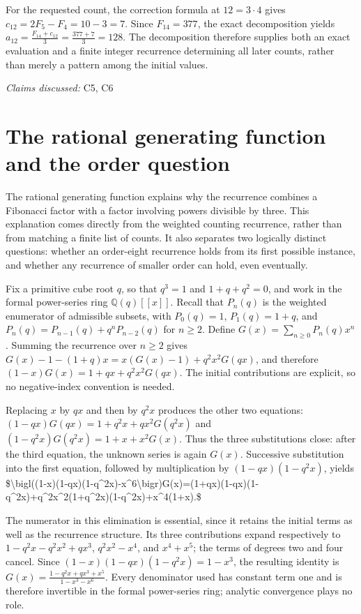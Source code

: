 \documentclass[11pt]{article}
\begin{document}
For the requested count, the correction formula at $12=3\cdot 4$ gives $c_{12}=2F_5-F_4=10-3=7$. Since $F_{14}=377$, the exact decomposition yields
$a_{12}=\frac{F_{14}+c_{12}}{3}=\frac{377+7}{3}=128.$
The decomposition therefore supplies both an exact evaluation and a finite integer recurrence determining all later counts, rather than merely a pattern among the initial values.

\textit{Claims discussed: }C5, C6
\section{The rational generating function and the order question}
The rational generating function explains why the recurrence combines a Fibonacci factor with a factor involving powers divisible by three. This explanation comes directly from the weighted counting recurrence, rather than from matching a finite list of counts. It also separates two logically distinct questions: whether an order-eight recurrence holds from its first possible instance, and whether any recurrence of smaller order can hold, even eventually.

Fix a primitive cube root $q$, so that $q^3=1$ and $1+q+q^2=0$, and work in the formal power-series ring $\mathbb{Q}(q)[[x]]$. Recall that $P_n(q)$ is the weighted enumerator of admissible subsets, with $P_0(q)=1$, $P_1(q)=1+q$, and $P_n(q)=P_{n-1}(q)+q^nP_{n-2}(q)$ for $n\geq2$. Define $G(x)=\sum_{n\geq0}P_n(q)x^n$. Summing the recurrence over $n\geq2$ gives $G(x)-1-(1+q)x=x(G(x)-1)+q^2x^2G(qx)$, and therefore
$(1-x)G(x)=1+qx+q^2x^2G(qx).$
The initial contributions are explicit, so no negative-index convention is needed.

Replacing $x$ by $qx$ and then by $q^2x$ produces the other two equations:
$(1-qx)G(qx)=1+q^2x+qx^2G(q^2x)$
and
$(1-q^2x)G(q^2x)=1+x+x^2G(x).$
Thus the three substitutions close: after the third equation, the unknown series is again $G(x)$. Successive substitution into the first equation, followed by multiplication by $(1-qx)(1-q^2x)$, yields
\$\textbackslash{}bigl((1-x)(1-qx)(1-q\textasciicircum{}2x)-x\textasciicircum{}6\textbackslash{}bigr)G(x)=(1+qx)(1-qx)(1-q\textasciicircum{}2x)+q\textasciicircum{}2x\textasciicircum{}2(1+q\textasciicircum{}2x)(1-q\textasciicircum{}2x)+x\textasciicircum{}4(1+x).\$

The numerator in this elimination is essential, since it retains the initial terms as well as the recurrence structure. Its three contributions expand respectively to $1-q^2x-q^2x^2+qx^3$, $q^2x^2-x^4$, and $x^4+x^5$; the terms of degrees two and four cancel. Since $(1-x)(1-qx)(1-q^2x)=1-x^3$, the resulting identity is
$G(x)=\frac{1-q^2x+qx^3+x^5}{1-x^3-x^6}.$
Every denominator used has constant term one and is therefore invertible in the formal power-series ring; analytic convergence plays no role.
\end{document}
